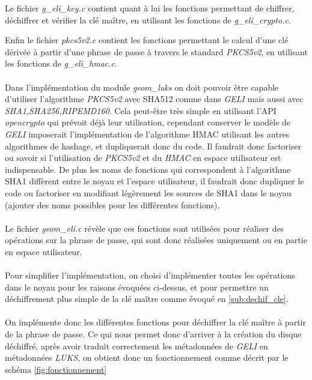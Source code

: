 Le fichier {\em g\_eli\_key.c} contient quant à lui les fonctions permettant de
chiffrer, déchiffrer et vérifier la clé maître, en utilisant les fonctions de
{\em g\_eli\_crypto.c}.

Enfin le fichier {\em pkcs5v2.c} contient les fonctions permettant le calcul
d'une clé dérivée à partir d'une phrase de passe à travers le standard
{\em PKCS5v2}, en utilisant les fonctions de {\em g\_eli\_hmac.c}.

\paragraph{}
Dans l'implémentation du module {\em geom\_luks} on doit pouvoir être capable
d'utiliser l'algorithme {\em PKCS5v2} avec SHA512 comme dans {\em GELI} mais
aussi avec {\em SHA1,SHA256,RIPEMD160}. Cela peut-être très simple en utilisant
l'API {\em opencrypto} qui prévoit déjà leur utilisation, cependant conserver
le modèle de {\em GELI} imposerait l'implémentation de l'algorithme HMAC utilisant
les autres algorithmes de hashage, et dupliquerait donc du code. Il faudrait
donc factoriser ou savoir si l'utilisation de {\em PKCS5v2} et du {\em HMAC}
en espace utilisateur est indispensable. De plus les noms de fonctions qui
correspondent à l'algorithme SHA1 diffèrent entre le noyau et l'espace
utilisateur, il faudrait donc dupliquer le code ou factoriser en modifiant
légèrement les sources de SHA1 dans le noyau (ajouter des noms possibles pour
les différentes fonctions).

\paragraph{}
Le fichier {\em geom\_eli.c} révèle que ces fonctions sont utilisées pour réaliser
des opérations sur la phrase de passe, qui sont donc réalisées uniquement ou
en partie en espace utilisateur.

\paragraph{}
Pour simplifier l'implémentation, on choisi d'implémenter toutes les opérations
dans le noyau pour les raisons évoquées ci-dessus, et pour permettre un 
déchiffrement plus simple de la clé maître comme évoqué en \ref{sub:dechif_cle}.
\paragraph{}
On implémente donc les différentes fonctions pour déchiffrer la clé maître à
partir de la phrase de passe. Ce qui nous permet donc d'arriver à la création
du disque déchiffré, après avoir traduit correctement les métadonnées de
{\em GELI} en métadonnées {\em LUKS}, on obtient donc un fonctionnement
comme décrit par le schéma \ref{fig:fonctionnement}


